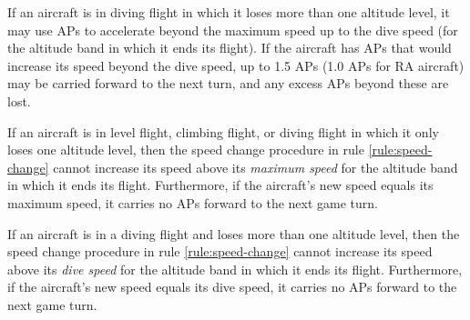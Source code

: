 {{If an aircraft is in diving flight in which it loses more than one altitude level, it may use APs to accelerate beyond the maximum speed up to the dive speed (for the altitude band in which it ends its flight). If the aircraft has APs that would increase its speed beyond the dive speed, up to 1.5 APs (1.0 APs for RA aircraft) may be carried forward to the next turn, and any excess APs beyond these are lost.
}{
If an aircraft is in level flight, climbing flight, or diving flight in which it only loses one altitude level, then the speed change procedure in rule \ref{rule:speed-change} cannot increase its speed above its \emph{maximum speed} for the altitude band in which it ends its flight. Furthermore, if the aircraft’s new speed equals its maximum speed, it carries no APs forward to the next game turn.

If an aircraft is in a diving flight and loses more than one altitude level, then the speed change procedure in rule \ref{rule:speed-change} cannot increase its speed above its \emph{dive speed} for the altitude band in which it ends its flight. Furthermore, if the aircraft’s new speed equals its dive speed, it carries no APs forward to the next game turn.}
}

